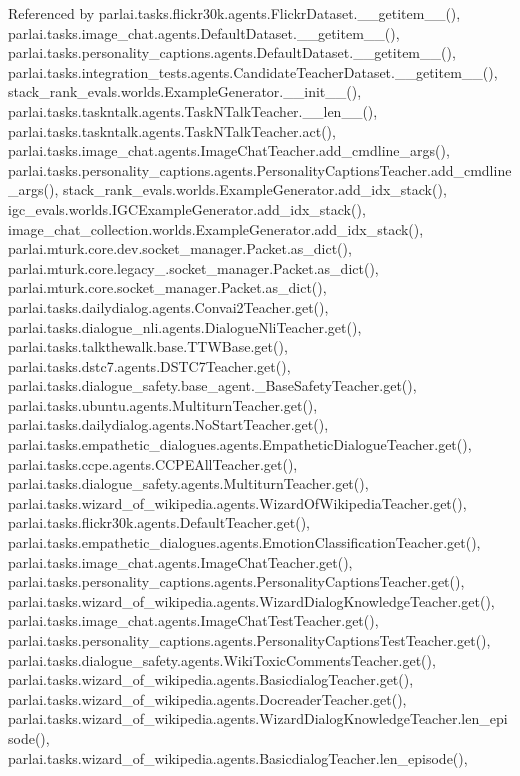 Referenced by parlai.\+tasks.\+flickr30k.\+agents.\+Flickr\+Dataset.\+\_\+\+\_\+getitem\+\_\+\+\_\+(), parlai.\+tasks.\+image\+\_\+chat.\+agents.\+Default\+Dataset.\+\_\+\+\_\+getitem\+\_\+\+\_\+(), parlai.\+tasks.\+personality\+\_\+captions.\+agents.\+Default\+Dataset.\+\_\+\+\_\+getitem\+\_\+\+\_\+(), parlai.\+tasks.\+integration\+\_\+tests.\+agents.\+Candidate\+Teacher\+Dataset.\+\_\+\+\_\+getitem\+\_\+\+\_\+(), stack\+\_\+rank\+\_\+evals.\+worlds.\+Example\+Generator.\+\_\+\+\_\+init\+\_\+\+\_\+(), parlai.\+tasks.\+taskntalk.\+agents.\+Task\+N\+Talk\+Teacher.\+\_\+\+\_\+len\+\_\+\+\_\+(), parlai.\+tasks.\+taskntalk.\+agents.\+Task\+N\+Talk\+Teacher.\+act(), parlai.\+tasks.\+image\+\_\+chat.\+agents.\+Image\+Chat\+Teacher.\+add\+\_\+cmdline\+\_\+args(), parlai.\+tasks.\+personality\+\_\+captions.\+agents.\+Personality\+Captions\+Teacher.\+add\+\_\+cmdline\+\_\+args(), stack\+\_\+rank\+\_\+evals.\+worlds.\+Example\+Generator.\+add\+\_\+idx\+\_\+stack(), igc\+\_\+evals.\+worlds.\+I\+G\+C\+Example\+Generator.\+add\+\_\+idx\+\_\+stack(), image\+\_\+chat\+\_\+collection.\+worlds.\+Example\+Generator.\+add\+\_\+idx\+\_\+stack(), parlai.\+mturk.\+core.\+dev.\+socket\+\_\+manager.\+Packet.\+as\+\_\+dict(), parlai.\+mturk.\+core.\+legacy\+\_.\+socket\+\_\+manager.\+Packet.\+as\+\_\+dict(), parlai.\+mturk.\+core.\+socket\+\_\+manager.\+Packet.\+as\+\_\+dict(), parlai.\+tasks.\+dailydialog.\+agents.\+Convai2\+Teacher.\+get(), parlai.\+tasks.\+dialogue\+\_\+nli.\+agents.\+Dialogue\+Nli\+Teacher.\+get(), parlai.\+tasks.\+talkthewalk.\+base.\+T\+T\+W\+Base.\+get(), parlai.\+tasks.\+dstc7.\+agents.\+D\+S\+T\+C7\+Teacher.\+get(), parlai.\+tasks.\+dialogue\+\_\+safety.\+base\+\_\+agent.\+\_\+\+Base\+Safety\+Teacher.\+get(), parlai.\+tasks.\+ubuntu.\+agents.\+Multiturn\+Teacher.\+get(), parlai.\+tasks.\+dailydialog.\+agents.\+No\+Start\+Teacher.\+get(), parlai.\+tasks.\+empathetic\+\_\+dialogues.\+agents.\+Empathetic\+Dialogue\+Teacher.\+get(), parlai.\+tasks.\+ccpe.\+agents.\+C\+C\+P\+E\+All\+Teacher.\+get(), parlai.\+tasks.\+dialogue\+\_\+safety.\+agents.\+Multiturn\+Teacher.\+get(), parlai.\+tasks.\+wizard\+\_\+of\+\_\+wikipedia.\+agents.\+Wizard\+Of\+Wikipedia\+Teacher.\+get(), parlai.\+tasks.\+flickr30k.\+agents.\+Default\+Teacher.\+get(), parlai.\+tasks.\+empathetic\+\_\+dialogues.\+agents.\+Emotion\+Classification\+Teacher.\+get(), parlai.\+tasks.\+image\+\_\+chat.\+agents.\+Image\+Chat\+Teacher.\+get(), parlai.\+tasks.\+personality\+\_\+captions.\+agents.\+Personality\+Captions\+Teacher.\+get(), parlai.\+tasks.\+wizard\+\_\+of\+\_\+wikipedia.\+agents.\+Wizard\+Dialog\+Knowledge\+Teacher.\+get(), parlai.\+tasks.\+image\+\_\+chat.\+agents.\+Image\+Chat\+Test\+Teacher.\+get(), parlai.\+tasks.\+personality\+\_\+captions.\+agents.\+Personality\+Captions\+Test\+Teacher.\+get(), parlai.\+tasks.\+dialogue\+\_\+safety.\+agents.\+Wiki\+Toxic\+Comments\+Teacher.\+get(), parlai.\+tasks.\+wizard\+\_\+of\+\_\+wikipedia.\+agents.\+Basicdialog\+Teacher.\+get(), parlai.\+tasks.\+wizard\+\_\+of\+\_\+wikipedia.\+agents.\+Docreader\+Teacher.\+get(), parlai.\+tasks.\+wizard\+\_\+of\+\_\+wikipedia.\+agents.\+Wizard\+Dialog\+Knowledge\+Teacher.\+len\+\_\+episode(), parlai.\+tasks.\+wizard\+\_\+of\+\_\+wikipedia.\+agents.\+Basicdialog\+Teacher.\+len\+\_\+episode(), 